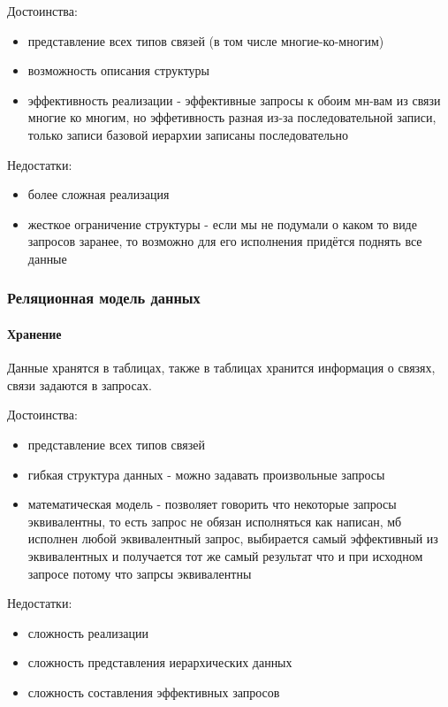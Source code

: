 \enewline

Достоинства:
\begin{itemize}
	\item представление всех типов связей (в том числе многие-ко-многим)
	\item возможность описания структуры
	\item эффективность реализации - эффективные запросы к обоим мн-вам из связи многие ко многим, но эффетивность разная из-за последовательной записи, только записи базовой иерархии записаны последовательно
\end{itemize}

Недостатки:
\begin{itemize}
	\item более сложная реализация
	\item жесткое ограничение структуры - если мы не подумали о каком то виде запросов заранее, то возможно для его исполнения придётся поднять все данные
\end{itemize}

\subsubsection{Реляционная модель данных}
\paragraph{Хранение}
Данные хранятся в таблицах, также в таблицах хранится информация о связях, связи задаются в запросах.

\enewline

Достоинства:
\begin{itemize}
	\item представление всех типов связей
	\item гибкая структура данных - можно задавать произвольные запросы
	\item математическая модель - позволяет говорить что некоторые запросы эквивалентны, то есть запрос не обязан исполняться как написан, мб исполнен любой эквивалентный запрос, выбирается самый эффективный из эквивалентных и получается тот же самый результат что и при исходном запросе потому что запрсы эквивалентны
\end{itemize}

Недостатки:
\begin{itemize}
	\item сложность реализации
	\item сложность представления иерархических данных
	\item сложность составления эффективных запросов
\end{itemize}

